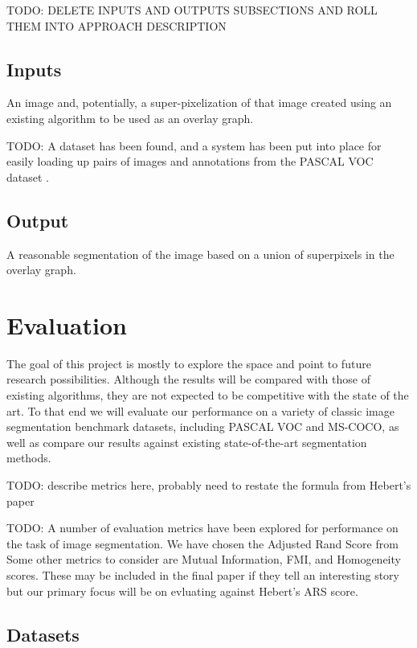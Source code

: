 \documentclass[twocolumn]{article}
\newcommand{\todo}[1]{}
\renewcommand{\todo}[1]{{\color{red} TODO: {#1}}}
\newcommand{\seclab}[1]{\label{sec:#1}}
\begin{document}
\todo{DELETE INPUTS AND OUTPUTS SUBSECTIONS AND ROLL THEM INTO APPROACH DESCRIPTION}
\subsection{Inputs}

An image and, potentially, a super-pixelization of that image created using an existing algorithm to be used as an overlay
graph.

\todo{
A dataset has been found, and a system has been put into place for easily loading up pairs of images and annotations from the
PASCAL VOC dataset \cite{Everingham10}. 
}

\subsection{Output}

A reasonable segmentation of the image based on a union of superpixels in the overlay graph.

\section{Evaluation}\seclab{eval}

The goal of this project is mostly to explore the space and point to future research possibilities. Although the results will
be compared with those of existing algorithms, they are not expected to be competitive with the state of the art. To that end
we will evaluate our performance on a variety of classic image segmentation benchmark datasets, including PASCAL VOC and
MS-COCO, as well as compare our results against existing state-of-the-art segmentation methods. 

\todo{describe metrics here, probably need to restate the formula from Hebert's paper}

\todo{
A number of evaluation metrics have been explored for performance on the task of image segmentation. We have chosen the
Adjusted Rand Score from \cite{unnikrishnan2005measure}  Some other metrics to consider are Mutual Information, FMI, and
Homogeneity scores. These may be included in the final paper if they tell an interesting story but our primary focus will be
on evluating against Hebert's ARS score.
}

\subsection{Datasets}\seclab{data}
\end{document}
